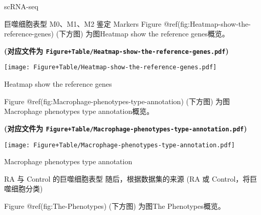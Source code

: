 \documentclass[
  ignorenonframetext,
]{beamer}
\begin{document}
\begin{frame}[fragile]{scRNA-seq}
\begin{block}{巨噬细胞表型 M0、M1、M2 鉴定 Markers}
Figure @ref(fig:Heatmap-show-the-reference-genes) (下方图) 为图Heatmap
show the reference genes概览。

\textbf{(对应文件为
\texttt{Figure+Table/Heatmap-show-the-reference-genes.pdf})}

\def\@captype{figure}
\begin{center}
\texttt{[image: Figure+Table/Heatmap-show-the-reference-genes.pdf]}
\caption{Heatmap show the reference genes}\label{fig:Heatmap-show-the-reference-genes}
\end{center}

\begin{center}\vspace{1.5cm}\end{center}

\begin{center}\vspace{1.5cm}\end{center}

Figure @ref(fig:Macrophage-phenotypes-type-annotation) (下方图)
为图Macrophage phenotypes type annotation概览。

\textbf{(对应文件为
\texttt{Figure+Table/Macrophage-phenotypes-type-annotation.pdf})}

\def\@captype{figure}
\begin{center}
\texttt{[image: Figure+Table/Macrophage-phenotypes-type-annotation.pdf]}
\caption{Macrophage phenotypes type annotation}\label{fig:Macrophage-phenotypes-type-annotation}
\end{center}

\begin{center}\vspace{1.5cm}\end{center}
\end{block}

\begin{block}{RA 与 Control 的巨噬细胞表型}
\protect\hypertarget{ra-ux4e0e-control-ux7684ux5de8ux566cux7ec6ux80deux8868ux578b}{}
随后，根据数据集的来源 (RA 或 Control，将巨噬细胞分类)

\begin{center}\vspace{1.5cm}\end{center}

Figure @ref(fig:The-Phenotypes) (下方图) 为图The Phenotypes概览。


\end{block}
\end{frame}
\end{document}
